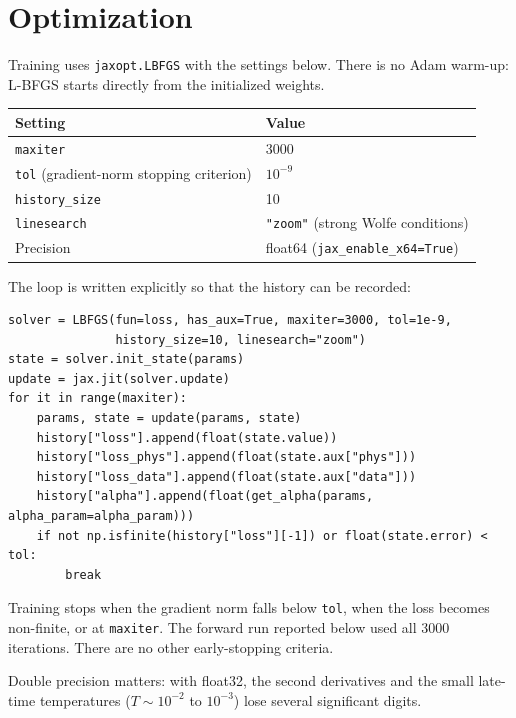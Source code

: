 \documentclass[10pt]{article}
\newcommand{\code}[1]{\texttt{#1}}
\begin{document}
\section{Optimization}
Training uses \code{jaxopt.LBFGS} with the settings below. There is no Adam warm-up: L-BFGS starts directly from the initialized weights.
\begin{center}
\begin{tabular}{ll}
\toprule
Setting & Value\\
\midrule
\code{maxiter} & 3000\\
\code{tol} (gradient-norm stopping criterion) & $10^{-9}$\\
\code{history\_size} & 10\\
\code{linesearch} & \code{"zoom"} (strong Wolfe conditions)\\
Precision & float64 (\code{jax\_enable\_x64=True})\\
\bottomrule
\end{tabular}
\end{center}
The loop is written explicitly so that the history can be recorded:
\begin{lstlisting}
solver = LBFGS(fun=loss, has_aux=True, maxiter=3000, tol=1e-9,
               history_size=10, linesearch="zoom")
state = solver.init_state(params)
update = jax.jit(solver.update)
for it in range(maxiter):
    params, state = update(params, state)
    history["loss"].append(float(state.value))
    history["loss_phys"].append(float(state.aux["phys"]))
    history["loss_data"].append(float(state.aux["data"]))
    history["alpha"].append(float(get_alpha(params, alpha_param=alpha_param)))
    if not np.isfinite(history["loss"][-1]) or float(state.error) < tol:
        break
\end{lstlisting}
Training stops when the gradient norm falls below \code{tol}, when the loss becomes non-finite, or at \code{maxiter}. The forward run reported below used all 3000 iterations. There are no other early-stopping criteria.

Double precision matters: with float32, the second derivatives and the small late-time temperatures ($T\sim10^{-2}$ to $10^{-3}$) lose several significant digits.
\end{document}
